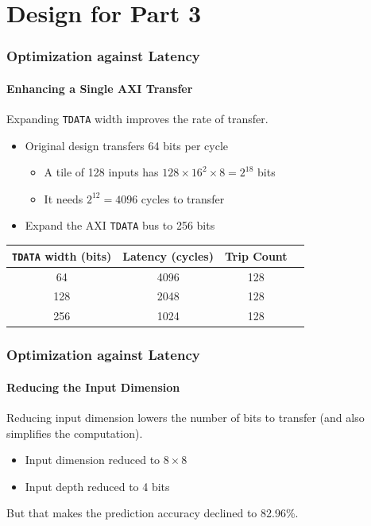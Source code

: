 \documentclass[aspectratio=169]{beamer}
\begin{document}
\section{Design for Part 3}

\begin{frame}
    \frametitle{Optimization against Latency}
    \framesubtitle{Enhancing a Single AXI Transfer}

    Expanding \texttt{TDATA} width improves the rate of transfer.
    \begin{itemize}
        \item Original design transfers 64 bits per cycle
              \begin{itemize}
                  \item A tile of 128 inputs has \(128 \times 16^2 \times 8 = 2^{18}\) bits
                  \item It needs \(2^{12} = 4096\) cycles to transfer
              \end{itemize}
        \item Expand the AXI \texttt{TDATA} bus to 256 bits
    \end{itemize}

    \begin{table}[ht!]
        \centering
        \begin{tabular}{cccc}
            \toprule
            \texttt{TDATA} width (bits) & Latency (cycles) & Trip Count \\
            \midrule
            64                          & 4096             & 128        \\
            128                         & 2048             & 128        \\
            256                         & 1024             & 128        \\
            \bottomrule
        \end{tabular}
    \end{table}

\end{frame}

\begin{frame}
    \frametitle{Optimization against Latency}
    \framesubtitle{Reducing the Input Dimension}

    Reducing input dimension lowers the number of bits to transfer (and also simplifies the computation).
    \begin{itemize}
        \item Input dimension reduced to \(8 \times 8\)
        \item Input depth reduced to 4 bits
    \end{itemize}
    But that makes the prediction accuracy declined to 82.96\%.

\end{frame}
\end{document}
